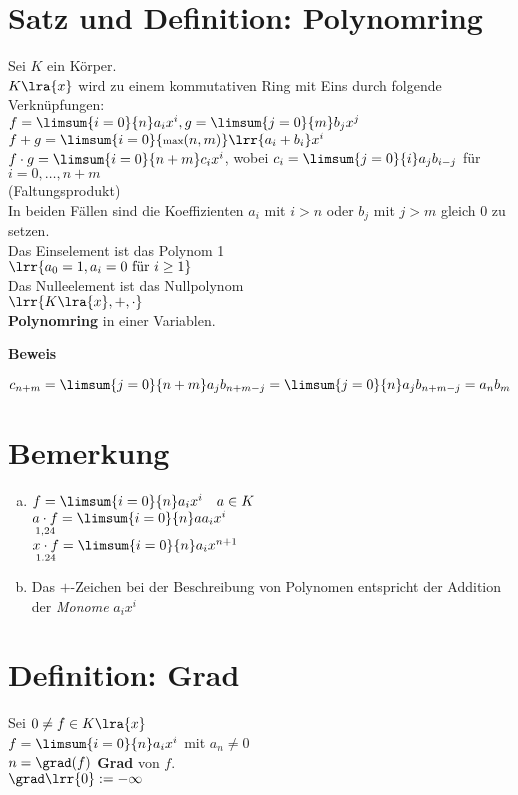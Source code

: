 \section{Satz und Definition: Polynomring}
	Sei $K$ ein Körper.\\
	$K\lra{x}$ wird zu einem kommutativen Ring mit Eins durch folgende Verknüpfungen:\\
	$f=\limsum{i=0}{n}a_ix^i, g=\limsum{j=0}{m}b_jx^j$\\
	$f+g = \limsum{i=0}{\mbox{\scriptsize max}(n,m)}\lrr{a_i+b_i}x^i$\\
	$f\cdot g= \limsum{i=0}{n+m} c_ix^i$, wobei $c_i=\limsum{j=0}{i}a_jb_{i-j}$ für $i=0,\dots,n+m$\\
	(Faltungsprodukt)\\
	In beiden Fällen sind die Koeffizienten $a_i$ mit $i>n$ oder $b_j$ mit $j>m$ gleich $0$ zu setzen.\\
	Das Einselement ist das Polynom 1\\
	$\lrr{a_0=1,a_i=0\mbox{ für }i\geq 1}$\\
	Das Nulleelement ist das Nullpolynom\\
	$\lrr{K\lra{x},+,\cdot}$\\
	\textbf{Polynomring} in einer Variablen.

	\textbf{Beweis}

	$c_{n+m}=\limsum{j=0}{n+m}a_jb_{n+m-j}=\limsum{j=0}{n}a_jb_{n+m-j}=a_nb_m$
\section{Bemerkung}
	\begin{enumerate}[a)]
		\item $f=\limsum{i=0}{n}a_ix^i\quad a\in K$\\
			$\underset{1,24}{a\cdot f} =\limsum{i=0}{n}aa_ix^i$\\
			$\underset{1.24}{x\cdot f} =\limsum{i=0}{n}a_ix^{n+1}$
		\item Das $+$-Zeichen bei der Beschreibung von Polynomen entspricht der Addition der \textit{Monome} $a_ix^i$
	\end{enumerate}
\section{Definition: Grad}
	Sei $0\neq f\in K\lra{x}$\\
	$f=\limsum{i=0}{n}a_ix^i$ mit $a_n\neq 0$\\
	$n=\grad(f)$ \textbf{Grad} von $f$.\\
	$\grad\lrr{0}:=-\infty$
